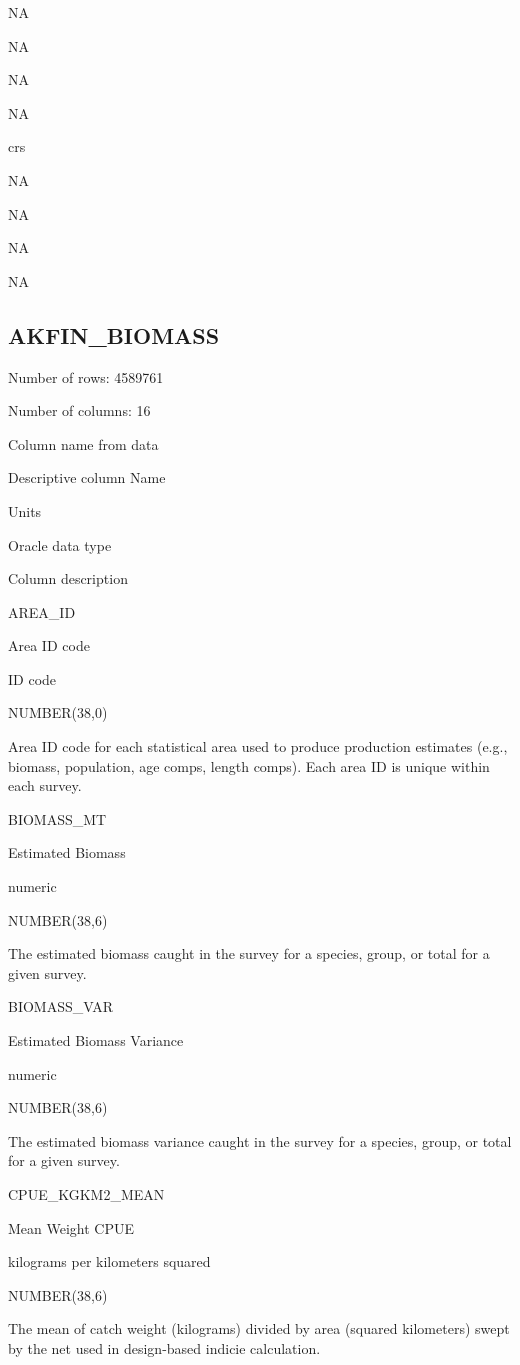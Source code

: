 \documentclass[
  letterpaper,
  oneside,
  open=any]{scrbook}
\begin{document}
NA

NA

NA

NA

crs

NA

NA

NA

NA

\hypertarget{akfin_biomass}{%
\subsection{AKFIN\_BIOMASS}\label{akfin_biomass}}

Number of rows: 4589761

Number of columns: 16

Column name from data

Descriptive column Name

Units

Oracle data type

Column description

AREA\_ID

Area ID code

ID code

NUMBER(38,0)

Area ID code for each statistical area used to produce production
estimates (e.g., biomass, population, age comps, length comps). Each
area ID is unique within each survey.

BIOMASS\_MT

Estimated Biomass

numeric

NUMBER(38,6)

The estimated biomass caught in the survey for a species, group, or
total for a given survey.

BIOMASS\_VAR

Estimated Biomass Variance

numeric

NUMBER(38,6)

The estimated biomass variance caught in the survey for a species,
group, or total for a given survey.

CPUE\_KGKM2\_MEAN

Mean Weight CPUE

kilograms per kilometers squared

NUMBER(38,6)

The mean of catch weight (kilograms) divided by area (squared
kilometers) swept by the net used in design-based indicie calculation.
\end{document}
